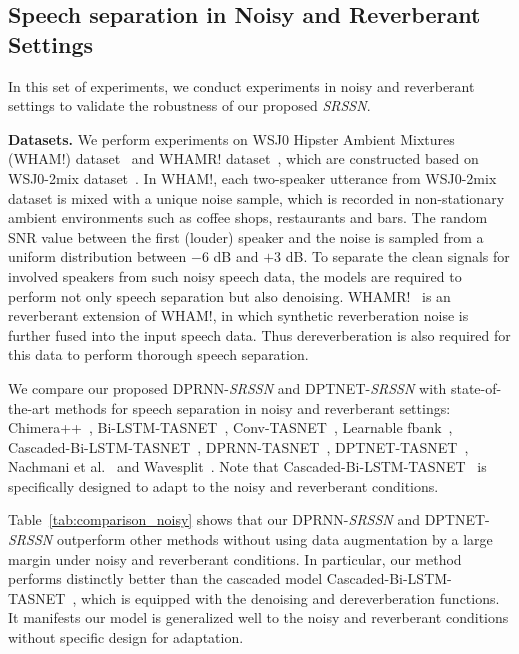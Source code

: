 \subsection{Speech separation in Noisy and Reverberant Settings}

In this set of experiments, we conduct experiments in noisy and reverberant settings to validate the robustness of our proposed \emph{SRSSN}.

\smallskip\noindent\textbf{Datasets.}
We perform experiments on WSJ0 Hipster Ambient Mixtures (WHAM!) dataset~\cite{WHAM} and WHAMR! dataset~\cite{WHAMR}, which are constructed based on WSJ0-2mix dataset~\cite{DPCL}. In WHAM!, each two-speaker utterance from WSJ0-2mix dataset is mixed with a unique noise sample, which is recorded in non-stationary ambient environments such as coffee shops, restaurants and bars. The random SNR value between the first (louder) speaker and the noise is sampled from a uniform distribution between $-$6 dB and $+$3 dB. To separate the clean signals for involved speakers from such noisy speech data, the models are required to perform not only speech separation but also denoising. WHAMR!~\cite{WHAMR} is an reverberant extension of WHAM!, in which synthetic reverberation noise is further fused into the input speech data. Thus dereverberation is also required for this data to perform thorough speech separation.

We compare our proposed DPRNN-\emph{SRSSN} and DPTNET-\emph{SRSSN} with state-of-the-art methods for speech separation in noisy and reverberant settings: Chimera++~\cite{WHAM}, Bi-LSTM-TASNET~\cite{WHAMR},   Conv-TASNET~\cite{filterbank, WHAMR}, 
Learnable fbank~\cite{filterbank}, 
Cascaded-Bi-LSTM-TASNET~\cite{WHAMR},
DPRNN-TASNET~\cite{MULCAT}, 
DPTNET-TASNET~\cite{DPTNet},
Nachmani et al.~\cite{MULCAT} and Wavesplit~\cite{wavesplit}.
Note that Cascaded-Bi-LSTM-TASNET~\cite{WHAMR} is specifically designed to adapt to the noisy and reverberant conditions. 

Table~\ref{tab:comparison_noisy} shows that our DPRNN-\emph{SRSSN} and DPTNET-\emph{SRSSN} outperform other methods without using data augmentation by a large margin under noisy and reverberant conditions.
In particular, our method performs distinctly better than the cascaded model Cascaded-Bi-LSTM-TASNET~\cite{WHAMR}, which is equipped with the denoising and dereverberation functions. It manifests our model is generalized well to the noisy and reverberant conditions without specific design for adaptation.

